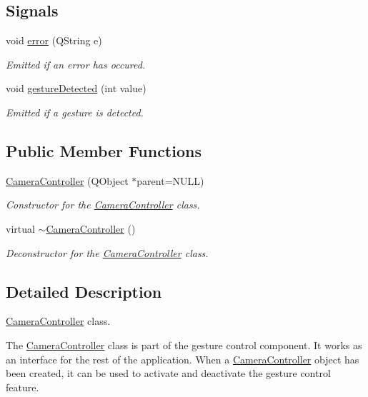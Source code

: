 \subsection*{Signals}
\begin{DoxyCompactItemize}
\item 
void \hyperlink{class_camera_controller_a83bfb3dd39d9d6bc1b80c31cb293c337}{error} (Q\+String e)
\begin{DoxyCompactList}\small\item\em Emitted if an error has occured. \end{DoxyCompactList}\item 
void \hyperlink{class_camera_controller_aef43092922808e9e4166bc28e7c9c7de}{gesture\+Detected} (int value)
\begin{DoxyCompactList}\small\item\em Emitted if a gesture is detected. \end{DoxyCompactList}\end{DoxyCompactItemize}
\subsection*{Public Member Functions}
\begin{DoxyCompactItemize}
\item 
\hyperlink{class_camera_controller_ab23fa2b1ef9167682f255dfdcf5fa657}{Camera\+Controller} (Q\+Object $\ast$parent=N\+U\+L\+L)
\begin{DoxyCompactList}\small\item\em Constructor for the \hyperlink{class_camera_controller}{Camera\+Controller} class. \end{DoxyCompactList}\item 
virtual \hyperlink{class_camera_controller_a9ecb9436179d1436803822196cd949e6}{$\sim$\+Camera\+Controller} ()
\begin{DoxyCompactList}\small\item\em Deconstructor for the \hyperlink{class_camera_controller}{Camera\+Controller} class. \end{DoxyCompactList}\end{DoxyCompactItemize}


\subsection{Detailed Description}
\hyperlink{class_camera_controller}{Camera\+Controller} class. 

The \hyperlink{class_camera_controller}{Camera\+Controller} class is part of the gesture control component. It works as an interface for the rest of the application. When a \hyperlink{class_camera_controller}{Camera\+Controller} object has been created, it can be used to activate and deactivate the gesture control feature. 


